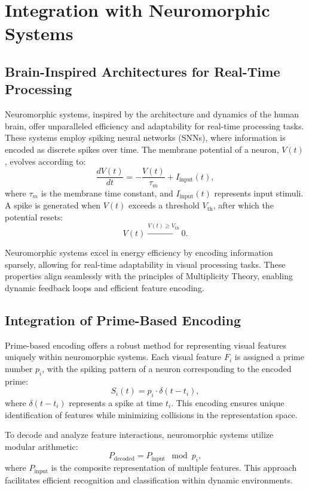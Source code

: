 \documentclass{article}
\theoremstyle{plain}
\begin{document}
\section{Integration with Neuromorphic Systems}

\subsection{Brain-Inspired Architectures for Real-Time Processing}
Neuromorphic systems, inspired by the architecture and dynamics of the human brain, offer unparalleled efficiency and adaptability for real-time processing tasks. These systems employ spiking neural networks (SNNs), where information is encoded as discrete spikes over time. The membrane potential of a neuron, \( V(t) \), evolves according to:
\begin{equation}
\frac{dV(t)}{dt} = -\frac{V(t)}{\tau_m} + I_{\text{input}}(t),
\end{equation}
where \( \tau_m \) is the membrane time constant, and \( I_{\text{input}}(t) \) represents input stimuli. A spike is generated when \( V(t) \) exceeds a threshold \( V_{\text{th}} \), after which the potential resets:
\begin{equation}
V(t) \xrightarrow{V(t) \geq V_{\text{th}}} 0.
\end{equation}

Neuromorphic systems excel in energy efficiency by encoding information sparsely, allowing for real-time adaptability in visual processing tasks. These properties align seamlessly with the principles of Multiplicity Theory, enabling dynamic feedback loops and efficient feature encoding.

\subsection{Integration of Prime-Based Encoding}
Prime-based encoding offers a robust method for representing visual features uniquely within neuromorphic systems. Each visual feature \( F_i \) is assigned a prime number \( p_i \), with the spiking pattern of a neuron corresponding to the encoded prime:
\begin{equation}
S_i(t) = p_i \cdot \delta(t - t_i),
\end{equation}
where \( \delta(t - t_i) \) represents a spike at time \( t_i \). This encoding ensures unique identification of features while minimizing collisions in the representation space.

To decode and analyze feature interactions, neuromorphic systems utilize modular arithmetic:
\begin{equation}
P_{\text{decoded}} = P_{\text{input}} \mod p_i,
\end{equation}
where \( P_{\text{input}} \) is the composite representation of multiple features. This approach facilitates efficient recognition and classification within dynamic environments.
\end{document}
